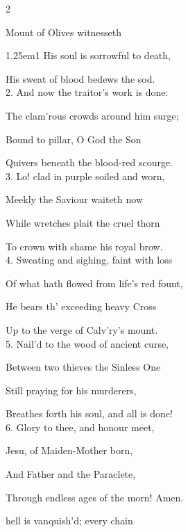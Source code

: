 \mattins
{}

\begin{paracol}{2}
\sloppy

\mattinsInvitatoryHymn
{} Mount of Olives witnesseth


\begin{hangparas}{1.25em}{1}
His soul is sorrowful to death,

His sweat of blood bedews the sod.\\

2. And now the traitor’s work is done:

The clam'rous crowds around him surge;

Bound to pillar, O God the Son

Quivers beneath the blood-red scourge.\\

3. Lo! clad in purple soiled and worn,

Meekly the Saviour waiteth now

While wretches plait the cruel thorn

To crown with shame his royal brow.\\

4. Sweating and sighing, faint with loss

Of what hath flowed from life’s red fount,

He bears th' exceeding heavy Cross

Up to the verge of Calv'ry’s mount.\\

5. Nail'd to the wood of ancient curse,

Between two thieves the Sinless One

Still praying for his murderers,

Breathes forth his soul, and all is done!\\

6. Glory to thee, and honour meet,

Jesu, of Maiden-Mother born,

And Father and the Paraclete,

Through endless ages of the morn! Amen.	
\end{hangparas}

\switchcolumn

\mattinsOfficeHymn
{} hell is vanquish'd; every chain


\end{paracol}
